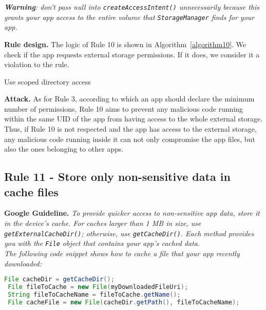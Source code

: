 \emph{\textbf{Warning}: don't pass null into \texttt{createAccessIntent()} unnecessarily because this grants your app access to the entire volume that \texttt{StorageManager} finds for your app.}

\textbf{Rule design.} The logic of Rule 10 is shown in Algorithm~\ref{algorithm10}. We check if the app requests external storage permissions. If it does, we consider it a violation to the rule.

\setcounter{algocf}{9}
\begin{algorithm}[]
\SetAlgoLined
{}
\caption{Use scoped directory access}
\label{algorithm10}
\end{algorithm}

\textbf{Attack.} As for Rule 3, according to which an app should declare the minimum number of permissions, Rule 10 aims to prevent any malicious code running within the same UID of the app from having access to the whole external storage. Thus, if Rule 10 is not respected and the app has access to the external storage, any malicious code running inside it can not only compromise the app files, but also the ones belonging to other apps. 

\subsection{Rule 11 - Store only non-sensitive data in cache files} 

\textbf{Google Guideline.} \emph{To provide quicker access to non-sensitive app data, store it in the device's cache. For caches larger than 1 MB in size, use \texttt{getExternalCacheDir()}; otherwise, use \texttt{getCacheDir()}. Each method provides you with the \texttt{File} object that contains your app's cached data.
\\
The following code snippet shows how to cache a file that your app recently downloaded:}
\begin{lstlisting}[language=Java, caption=Store only non-sensitive data in cache files, numbers=none]
 File cacheDir = getCacheDir();
 File fileToCache = new File(myDownloadedFileUri);
 String fileToCacheName = fileToCache.getName();
 File cacheFile = new File(cacheDir.getPath(), fileToCacheName);
\end{lstlisting}

